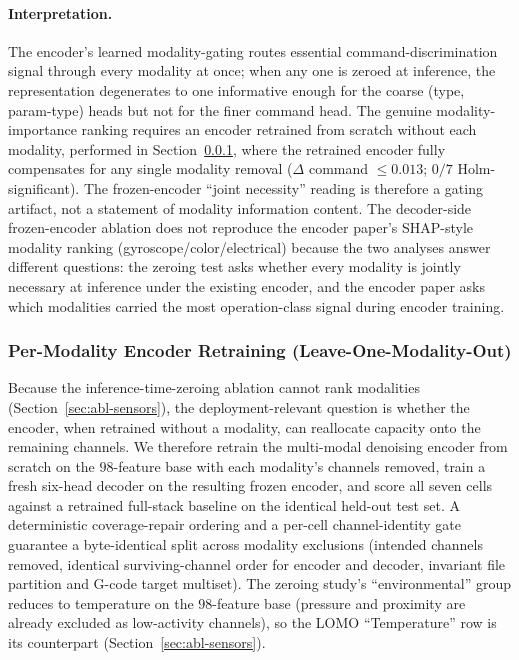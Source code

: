 \documentclass[sensors,article,submit,moreauthors,pdftex]{Definitions/mdpi}
\begin{document}
\paragraph{Interpretation.} The encoder's learned modality-gating routes essential command-discrimination signal through every modality at once; when any one is zeroed at inference, the representation degenerates to one informative enough for the coarse (type, param-type) heads but not for the finer command head. The genuine modality-importance ranking requires an encoder retrained from scratch without each modality, performed in Section~\ref{sec:abl-lomo}, where the retrained encoder fully compensates for any single modality removal ($\Delta$ command $\le 0.013$; $0/7$ Holm-significant). The frozen-encoder ``joint necessity'' reading is therefore a gating artifact, not a statement of modality information content. The decoder-side frozen-encoder ablation does not reproduce the encoder paper's SHAP-style modality ranking (gyroscope/color/electrical) because the two analyses answer different questions: the zeroing test asks whether every modality is jointly necessary at inference under the existing encoder, and the encoder paper asks which modalities carried the most operation-class signal during encoder training.

\subsubsection{Per-Modality Encoder Retraining (Leave-One-Modality-Out)}
\label{sec:abl-lomo}

Because the inference-time-zeroing ablation cannot rank modalities (Section~\ref{sec:abl-sensors}), the deployment-relevant question is whether the encoder, when retrained without a modality, can reallocate capacity onto the remaining channels. We therefore retrain the multi-modal denoising encoder from scratch on the $98$-feature base with each modality's channels removed, train a fresh six-head decoder on the resulting frozen encoder, and score all seven cells against a retrained full-stack baseline on the identical held-out test set. A deterministic coverage-repair ordering and a per-cell channel-identity gate guarantee a byte-identical split across modality exclusions (intended channels removed, identical surviving-channel order for encoder and decoder, invariant file partition and G-code target multiset). The zeroing study's ``environmental'' group reduces to temperature on the $98$-feature base (pressure and proximity are already excluded as low-activity channels), so the LOMO ``Temperature'' row is its counterpart (Section~\ref{sec:abl-sensors}).
\end{document}

